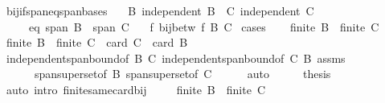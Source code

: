 \begin{isabellebody}
\isamarkupfalse%
%
\endisatagproof
{\isafoldproof}%
%
\isadelimproof
\isanewline
%
\endisadelimproof
\isanewline
{}\isamarkupfalse%
\ bij{\isacharunderscore}{\kern0pt}if{\isacharunderscore}{\kern0pt}span{\isacharunderscore}{\kern0pt}eq{\isacharunderscore}{\kern0pt}span{\isacharunderscore}{\kern0pt}bases{\isacharcolon}{\kern0pt}\isanewline
\ \ \ B{\isacharcolon}{\kern0pt}\ {\isachardoublequoteopen}independent\ B{\isachardoublequoteclose}\ \ C{\isacharcolon}{\kern0pt}\ {\isachardoublequoteopen}independent\ C{\isachardoublequoteclose}\isanewline
\ \ \ \ \ eq{\isacharcolon}{\kern0pt}\ {\isachardoublequoteopen}span\ B\ {\isacharequal}{\kern0pt}\ span\ C{\isachardoublequoteclose}\isanewline
\ \ \ {\isachardoublequoteopen}{\isasymexists}f{\isachardot}{\kern0pt}\ bij{\isacharunderscore}{\kern0pt}betw\ f\ B\ C{\isachardoublequoteclose}\isanewline
%
\isadelimproof
%
\endisadelimproof
%
\isatagproof
{}\isamarkupfalse%
\ cases\isanewline
\ \ \isamarkupfalse%
\ {\isachardoublequoteopen}finite\ B\ {\isasymor}\ finite\ C{\isachardoublequoteclose}\isanewline
\ \ \isamarkupfalse%
\ \isamarkupfalse%
\ {\isachardoublequoteopen}finite\ B\ {\isasymand}\ finite\ C\ {\isasymand}\ card\ C\ {\isacharequal}{\kern0pt}\ card\ B{\isachardoublequoteclose}\isanewline
\ \ \ \ \isamarkupfalse%
\ independent{\isacharunderscore}{\kern0pt}span{\isacharunderscore}{\kern0pt}bound{\isacharbrackleft}{\kern0pt}of\ B\ C{\isacharbrackright}{\kern0pt}\ independent{\isacharunderscore}{\kern0pt}span{\isacharunderscore}{\kern0pt}bound{\isacharbrackleft}{\kern0pt}of\ C\ B{\isacharbrackright}{\kern0pt}\ assms\isanewline
\ \ \ \ \ \ span{\isacharunderscore}{\kern0pt}superset{\isacharbrackleft}{\kern0pt}of\ B{\isacharbrackright}{\kern0pt}\ span{\isacharunderscore}{\kern0pt}superset{\isacharbrackleft}{\kern0pt}of\ C{\isacharbrackright}{\kern0pt}\isanewline
\ \ \ \ \isamarkupfalse%
\ auto\isanewline
\ \ \isamarkupfalse%
\ \isamarkupfalse%
\ {\isacharquery}{\kern0pt}thesis\isanewline
\ \ \ \ \isamarkupfalse%
\ {\isacharparenleft}{\kern0pt}auto\ intro{\isacharbang}{\kern0pt}{\isacharcolon}{\kern0pt}\ finite{\isacharunderscore}{\kern0pt}same{\isacharunderscore}{\kern0pt}card{\isacharunderscore}{\kern0pt}bij{\isacharparenright}{\kern0pt}\isanewline
{}\isamarkupfalse%
\isanewline
\ \ \isamarkupfalse%
\ {\isachardoublequoteopen}{\isasymnot}\ {\isacharparenleft}{\kern0pt}finite\ B\ {\isasymor}\ finite\ C{\isacharparenright}{\kern0pt}{\isachardoublequoteclose}\isanewline

\end{isabellebody}
